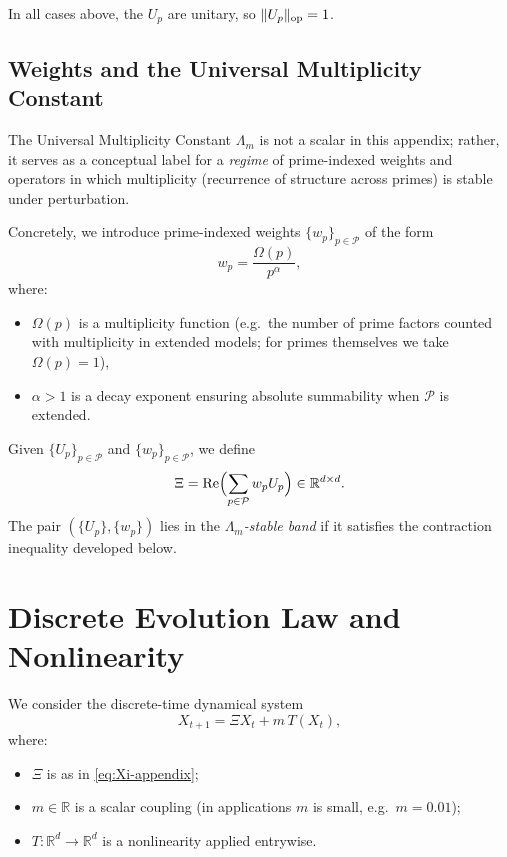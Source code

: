 \documentclass[11pt,letterpaper]{article}
\begin{document}
In all cases above, the \(U_p\) are unitary, so
\(\|U_p\|_{\rm op} = 1\).

\subsection{Weights and the Universal Multiplicity Constant}

The Universal Multiplicity Constant \(\Lambda_m\) is not a scalar in this
appendix; rather, it serves as a conceptual label for a \emph{regime} of
prime-indexed weights and operators in which multiplicity (recurrence of
structure across primes) is stable under perturbation.

Concretely, we introduce prime-indexed weights
\(\{w_p\}_{p \in \mathcal{P}}\) of the form
\begin{equation}
  w_p = \frac{\Omega(p)}{p^\alpha},
  \label{eq:wp-def}
\end{equation}
where:
\begin{itemize}[leftmargin=*]
  \item \(\Omega(p)\) is a multiplicity function (e.g.\ the number of
  prime factors counted with multiplicity in extended models; for primes
  themselves we take \(\Omega(p) = 1\)),
  \item \(\alpha > 1\) is a decay exponent ensuring absolute summability
        when \(\mathcal{P}\) is extended.
\end{itemize}

Given \(\{U_p\}_{p\in\mathcal{P}}\) and \(\{w_p\}_{p\in\mathcal{P}}\), we define
\begin{equation}
  \Xi = \operatorname{Re}\Bigl(\sum_{p\in\mathcal{P}} w_p U_p\Bigr)
  \in \mathbb{R}^{d\times d}.
  \label{eq:Xi-appendix}
\end{equation}
The pair \((\{U_p\},\{w_p\})\) lies in the \emph{\(\Lambda_m\)-stable band}
if it satisfies the contraction inequality developed below.

\section{Discrete Evolution Law and Nonlinearity}

We consider the discrete-time dynamical system
\begin{equation}
  X_{t+1} = \Xi X_t + m\, T(X_t),
  \label{eq:evolution-appendix}
\end{equation}
where:

\begin{itemize}[leftmargin=*]
  \item \(\Xi\) is as in \eqref{eq:Xi-appendix};
  \item \(m \in \mathbb{R}\) is a scalar coupling (in applications \(m\)
  is small, e.g.\ \(m = 0.01\));
  \item \(T : \mathbb{R}^d \to \mathbb{R}^d\) is a nonlinearity applied
  entrywise.
\end{itemize}
\end{document}
